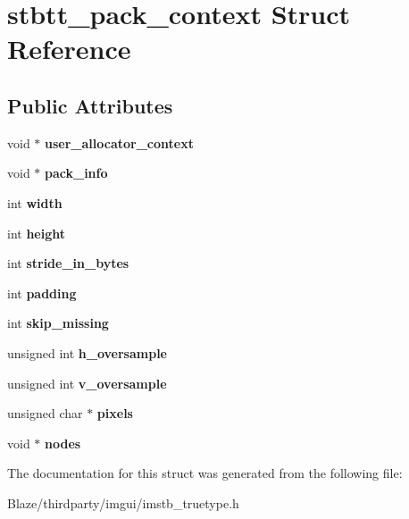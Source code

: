 \hypertarget{structstbtt__pack__context}{}\section{stbtt\+\_\+pack\+\_\+context Struct Reference}
\label{structstbtt__pack__context}
\subsection*{Public Attributes}
\begin{DoxyCompactItemize}
\item 
\mbox{\label{structstbtt__pack__context_a45fddc4d4adfcef58aa08ad2874cedc0}} 
void $\ast$ {\bfseries user\+\_\+allocator\+\_\+context}
\item 
\mbox{\label{structstbtt__pack__context_a303a72f0a39479b439fa531925be7031}} 
void $\ast$ {\bfseries pack\+\_\+info}
\item 
\mbox{\label{structstbtt__pack__context_a5da0b7b5d3b82d5fc75ea1c8945183fa}} 
int {\bfseries width}
\item 
\mbox{\label{structstbtt__pack__context_a817ec010d7f09ba9776517c5a87f13a7}} 
int {\bfseries height}
\item 
\mbox{\label{structstbtt__pack__context_abbe9a25aae0e26b81a5f7339fac23801}} 
int {\bfseries stride\+\_\+in\+\_\+bytes}
\item 
\mbox{\label{structstbtt__pack__context_a1191f34fa995910044191584f0d7a803}} 
int {\bfseries padding}
\item 
\mbox{\label{structstbtt__pack__context_a435bae89225862e65211e0b456f632d3}} 
int {\bfseries skip\+\_\+missing}
\item 
\mbox{\label{structstbtt__pack__context_aee1019f9634cad49fa07e8e1f897d6b7}} 
unsigned int {\bfseries h\+\_\+oversample}
\item 
\mbox{\label{structstbtt__pack__context_a4b55efa27ef36e7f258afe92921784c0}} 
unsigned int {\bfseries v\+\_\+oversample}
\item 
\mbox{\label{structstbtt__pack__context_a6549105fd1922df983fbe036b9db4a1a}} 
unsigned char $\ast$ {\bfseries pixels}
\item 
\mbox{\label{structstbtt__pack__context_a11a73fa6860e6be1ac039fcca9db2c7c}} 
void $\ast$ {\bfseries nodes}
\end{DoxyCompactItemize}


The documentation for this struct was generated from the following file\+:\begin{DoxyCompactItemize}
\item 
Blaze/thirdparty/imgui/imstb\+\_\+truetype.\+h\end{DoxyCompactItemize}
